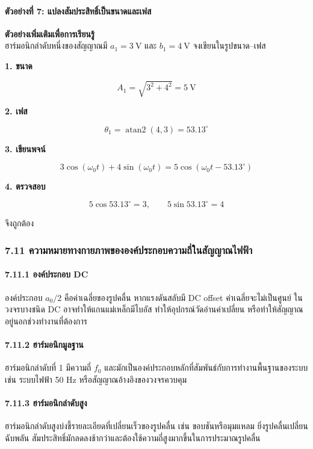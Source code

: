 \paragraph{ตัวอย่างที่ 7: แปลงสัมประสิทธิ์เป็นขนาดและเฟส}

\textbf{ตัวอย่างเพิ่มเติมเพื่อการเรียนรู้}\\
ฮาร์มอนิกลำดับหนึ่งของสัญญาณมี \(a_1=3\ \text{V}\) และ \(b_1=4\ \text{V}\) จงเขียนในรูปขนาด--เฟส

\textbf{1. ขนาด}

\[
A_1=\sqrt{3^2+4^2}=5\ \text{V}
\]

\textbf{2. เฟส}

\[
\theta_1=\operatorname{atan2}(4,3)=53.13^\circ
\]

\textbf{3. เขียนพจน์}

\[
3\cos(\omega_0t)+4\sin(\omega_0t)
=5\cos(\omega_0t-53.13^\circ)
\]

\textbf{4. ตรวจสอบ}

\[
5\cos 53.13^\circ=3,
\qquad
5\sin 53.13^\circ=4
\]

จึงถูกต้อง

\subsubsection{7.11 ความหมายทางกายภาพขององค์ประกอบความถี่ในสัญญาณไฟฟ้า}

\paragraph{7.11.1 องค์ประกอบ DC}

องค์ประกอบ \(a_0/2\) คือค่าเฉลี่ยของรูปคลื่น หากแรงดันสลับมี DC offset ค่าเฉลี่ยจะไม่เป็นศูนย์ ในวงจรบางชนิด DC อาจทำให้แกนแม่เหล็กมีไบอัส ทำให้อุปกรณ์วัดอ่านค่าเปลี่ยน หรือทำให้สัญญาณอยู่นอกช่วงทำงานที่ต้องการ

\paragraph{7.11.2 ฮาร์มอนิกมูลฐาน}

ฮาร์มอนิกลำดับที่ 1 มีความถี่ \(f_0\) และมักเป็นองค์ประกอบหลักที่สัมพันธ์กับการทำงานพื้นฐานของระบบ เช่น ระบบไฟฟ้า 50 Hz หรือสัญญาณอ้างอิงของวงจรควบคุม

\paragraph{7.11.3 ฮาร์มอนิกลำดับสูง}

ฮาร์มอนิกลำดับสูงบ่งชี้รายละเอียดที่เปลี่ยนเร็วของรูปคลื่น เช่น ขอบชันหรือมุมแหลม ยิ่งรูปคลื่นเปลี่ยนฉับพลัน สัมประสิทธิ์มักลดลงช้ากว่าและต้องใช้ความถี่สูงมากขึ้นในการประมาณรูปคลื่น

